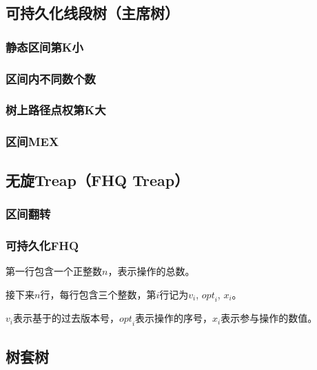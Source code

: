 \documentclass[landscape,twocolumn,twoside,a4paper]{article}
\begin{document}
\subsection{可持久化线段树（主席树）}

\subsubsection{静态区间第K小}


\subsubsection{区间内不同数个数}


\subsubsection{树上路径点权第K大}


\subsubsection{区间MEX}


\subsection{无旋Treap（FHQ Treap）}
\subsubsection{区间翻转}


\subsubsection{可持久化FHQ}
第一行包含一个正整数$n$，表示操作的总数。\par
接下来$n$行，每行包含三个整数，第$i$行记为${v}_{i}$, ${opt}_i$, $x_i$。\par
$v_i$表示基于的过去版本号，${opt}_i$表示操作的序号，$x_i$表示参与操作的数值。



\subsection{树套树}
\end{document}
